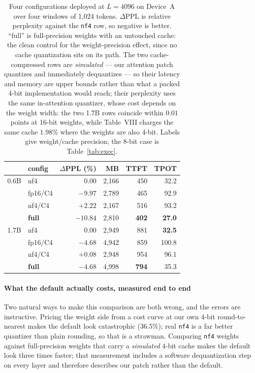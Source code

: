 \documentclass[10pt,journal]{IEEEtran}
\begin{document}
\begin{table}[t]
\centering
\caption{Four configurations deployed at $L{=}4096$ on Device~A over four
windows of 1{,}024 tokens. $\Delta$PPL is relative perplexity against the
\texttt{nf4} row, so negative is better. ``full'' is full-precision weights with
an untouched cache: the clean control for the weight-precision effect, since no
cache quantization sits on its path. The two cache-compressed rows are
\emph{simulated} --- our attention patch quantizes and immediately dequantizes ---
so their latency and memory are upper bounds rather than what a packed 4-bit
implementation would reach; their perplexity uses the same in-attention quantizer, whose cost
depends on the weight width: the two 1.7B rows coincide within $0.01$ points
at 16-bit weights, while Table~VIII charges the same cache $1.98\%$ where
the weights are also 4-bit. Labels give weight/cache precision; the 8-bit case is Table~\ref{tab:exec}.}
\label{tab:headtohead}
\begin{tabular}{@{}llrrrr@{}}
\toprule
 & config & $\Delta$PPL (\%) & MB & TTFT & TPOT \\
\midrule
0.6B & nf4     & $0.00$ & 2{,}166 & 450 & 32.2 \\
     & fp16/C4 & $\mathbf{-9.97}$ & 2{,}789 & 465 & 92.9 \\
     & nf4/C4  & $+2.22$ & 2{,}167 & 516 & 93.2 \\
     & \textbf{full} & $\mathbf{-10.84}$ & 2{,}810 & \textbf{402} & \textbf{27.0} \\
\midrule
1.7B & nf4     & $0.00$ & 2{,}949 & 881 & \textbf{32.5} \\
     & fp16/C4 & $\mathbf{-4.68}$ & 4{,}942 & 859 & 100.8 \\
     & nf4/C4  & $+0.08$ & 2{,}948 & 954 & 96.1 \\
     & \textbf{full} & $\mathbf{-4.68}$ & 4{,}998 & \textbf{794} & 35.3 \\
\bottomrule
\end{tabular}
\end{table}

\paragraph*{What the default actually costs, measured end to end}
Two natural ways to make this comparison are both wrong, and the errors are
instructive. Pricing the weight side from a cost curve at our own 4-bit
round-to-nearest makes the default look catastrophic ($36.5\%$); real \texttt{nf4}
is a far better quantizer than plain rounding, so that is a strawman. Comparing
\texttt{nf4} weights against full-precision weights that carry a \emph{simulated}
4-bit cache makes the default look three times faster; that measurement includes a
software dequantization step on every layer and therefore describes our patch
rather than the default.
\end{document}
